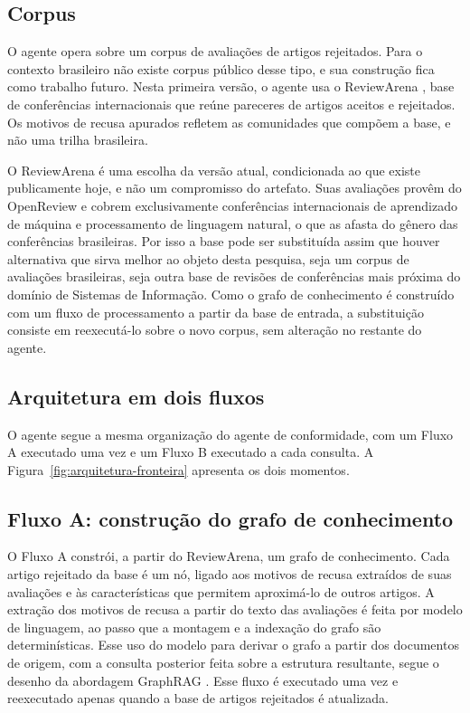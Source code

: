 \subsection{Corpus}
\label{sec:corpus-fronteira}

O agente opera sobre um corpus de avaliações de artigos rejeitados. Para o contexto brasileiro não existe corpus público desse tipo, e sua construção fica como trabalho futuro. Nesta primeira versão, o agente usa o ReviewArena \cite{ReviewArena}, base de conferências internacionais que reúne pareceres de artigos aceitos e rejeitados. Os motivos de recusa apurados refletem as comunidades que compõem a base, e não uma trilha brasileira.
 
O ReviewArena é uma escolha da versão atual, condicionada ao que existe publicamente hoje, e não um compromisso do artefato. Suas avaliações provêm do OpenReview e cobrem exclusivamente conferências internacionais de aprendizado de máquina e processamento de linguagem natural, o que as afasta do gênero das conferências brasileiras. Por isso a base pode ser substituída assim que houver alternativa que sirva melhor ao objeto desta pesquisa, seja um corpus de avaliações brasileiras, seja outra base de revisões de conferências mais próxima do domínio de Sistemas de Informação. Como o grafo de conhecimento é construído com um fluxo de processamento a partir da base de entrada, a substituição consiste em reexecutá-lo sobre o novo corpus, sem alteração no restante do agente. 
 
\subsection{Arquitetura em dois fluxos}
\label{sec:arquitetura-fronteira}

O agente segue a mesma organização do agente de conformidade, com um Fluxo A executado uma vez e um Fluxo B executado a cada consulta. A Figura~\ref{fig:arquitetura-fronteira} apresenta os dois momentos.

\subsection{Fluxo A: construção do grafo de conhecimento}
\label{sec:fluxo-a-fronteira}

O Fluxo A constrói, a partir do ReviewArena, um grafo de conhecimento. Cada artigo rejeitado da base é um nó, ligado aos motivos de recusa extraídos de suas avaliações e às características que permitem aproximá-lo de outros artigos. A extração dos motivos de recusa a partir do texto das avaliações é feita por modelo de linguagem, ao passo que a montagem e a indexação do grafo são determinísticas. Esse uso do modelo para derivar o grafo a partir dos documentos de origem, com a consulta posterior feita sobre a estrutura resultante, segue o desenho da abordagem GraphRAG \cite{EdgeGraphRAG2024}. Esse fluxo é executado uma vez e reexecutado apenas quando a base de artigos rejeitados é atualizada.
 
